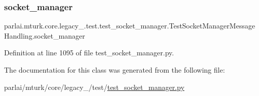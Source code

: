 \subsubsection{\texorpdfstring{socket\+\_\+manager}{socket\_manager}}
{\footnotesize\ttfamily parlai.\+mturk.\+core.\+legacy\+\_.\+test.\+test\+\_\+socket\+\_\+manager.\+Test\+Socket\+Manager\+Message\+Handling.\+socket\+\_\+manager}



Definition at line 1095 of file test\+\_\+socket\+\_\+manager.\+py.



The documentation for this class was generated from the following file\+:\begin{DoxyCompactItemize}
\item 
parlai/mturk/core/legacy\+\_/test/\hyperlink{legacy__2018_2test_2test__socket__manager_8py}{test\+\_\+socket\+\_\+manager.\+py}\end{DoxyCompactItemize}

